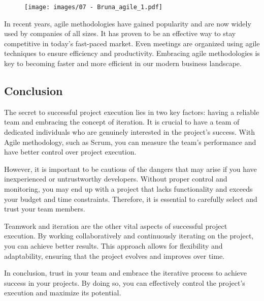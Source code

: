 \begin{figure}[!h]
    \centering
    \texttt{[image: images/07 - Bruna\_agile\_1.pdf]}
\end{figure}

In recent years, agile methodologies have gained popularity and are now
widely used by companies of all sizes. It has proven to be an effective
way to stay competitive in today's fast-paced market. Even meetings are
organized using agile techniques to ensure efficiency and productivity.
Embracing agile methodologies is key to becoming faster and more
efficient in our modern business landscape.

\subsection{Conclusion}

The secret to successful project execution lies in two key factors:
having a reliable team and embracing the concept of iteration. It is
crucial to have a team of dedicated individuals who are genuinely
interested in the project's success. With Agile methodology, such as
Scrum, you can measure the team's performance and have better control
over project execution.

However, it is important to be cautious of the dangers that may arise if
you have inexperienced or untrustworthy developers. Without proper
control and monitoring, you may end up with a project that lacks
functionality and exceeds your budget and time constraints. Therefore,
it is essential to carefully select and trust your team members.

Teamwork and iteration are the other vital aspects of successful project
execution. By working collaboratively and continuously iterating on the
project, you can achieve better results. This approach allows for
flexibility and adaptability, ensuring that the project evolves and
improves over time.

In conclusion, trust in your team and embrace the iterative process to
achieve success in your projects. By doing so, you can effectively
control the project's execution and maximize its potential.
